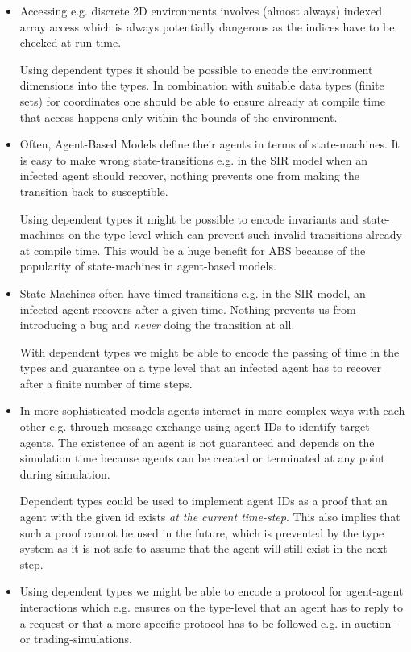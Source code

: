 \begin{itemize}
	\item Accessing e.g. discrete 2D environments involves (almost always) indexed array access which is always potentially dangerous as the indices have to be checked at run-time.
	
	Using dependent types it should be possible to encode the environment dimensions into the types. In combination with suitable data types (finite sets) for coordinates one should be able to ensure already at compile time that access happens only within the bounds of the environment.
	
	\item Often, Agent-Based Models define their agents in terms of state-machines. It is easy to make wrong state-transitions e.g. in the SIR model when an infected agent should recover, nothing prevents one from making the transition back to susceptible. 
	
	Using dependent types it might be possible to encode invariants and state-machines on the type level which can prevent such invalid transitions already at compile time. This would be a huge benefit for ABS because of the popularity of state-machines in agent-based models.
	
	\item State-Machines often have timed transitions e.g. in the SIR model, an infected agent recovers after a given time. Nothing prevents us from introducing a bug and \textit{never} doing the transition at all.
	
	With dependent types we might be able to encode the passing of time in the types and guarantee on a type level that an infected agent has to recover after a finite number of time steps.
	
	\item In more sophisticated models agents interact in more complex ways with each other e.g. through message exchange using agent IDs to identify target agents. The existence of an agent is not guaranteed and depends on the simulation time because agents can be created or terminated at any point during simulation. 
	
	Dependent types could be used to implement agent IDs as a proof that an agent with the given id exists \textit{at the current time-step}. This also implies that such a proof cannot be used in the future, which is prevented by the type system as it is not safe to assume that the agent will still exist in the next step.
	
	\item Using dependent types we might be able to encode a protocol for agent-agent interactions which e.g. ensures on the type-level that an agent has to reply to a request or that a more specific protocol has to be followed e.g. in auction- or trading-simulations.
	

\end{itemize}
